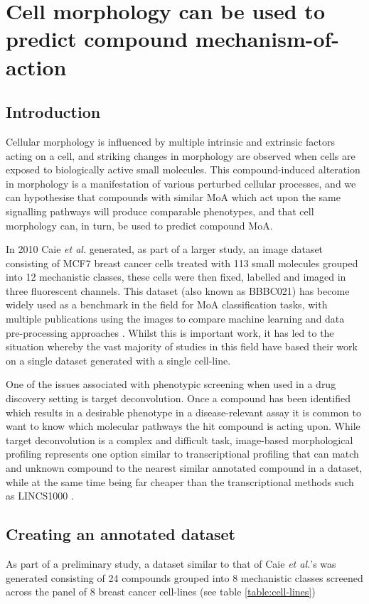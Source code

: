 \documentclass[a4paper,11pt,twoside,openright]{scrbook}
\begin{document}
\chapter{Cell morphology can be used to predict compound mechanism-of-action} \label{chapter:moa}

\section{Introduction}
Cellular morphology is influenced by multiple intrinsic and extrinsic factors acting on a cell, and striking changes in morphology are observed when cells are exposed to biologically active small molecules.
This compound-induced alteration in morphology is a manifestation of various perturbed cellular processes, and we can hypothesise that compounds with similar MoA which act upon the same signalling pathways will produce comparable phenotypes, and that cell morphology can, in turn, be used to predict compound MoA.

In 2010 Caie \textit{et al.} generated, as part of a larger study, an image dataset consisting of MCF7 breast cancer cells treated with 113 small molecules grouped into 12 mechanistic classes, these cells were then fixed, labelled and imaged in three fluorescent channels\cite{Caie2010}.
This dataset (also known as BBBC021) has become widely used as a benchmark in the field for MoA classification tasks, with multiple publications using the images to compare machine learning and data pre-processing approaches \cite{Ljosa2013a,Singh2014a,Pawlowski2016,Ando2017}.
Whilst this is important work, it has led to the situation whereby the vast majority of studies in this field have based their work on a single dataset generated with a single cell-line.

One of the issues associated with phenotypic screening when used in a drug discovery setting is target deconvolution.
Once a compound has been identified which results in a desirable phenotype in a disease-relevant assay it is common to want to know which molecular pathways the hit compound is acting upon.
While target deconvolution is a complex and difficult task, image-based morphological profiling represents one option similar to transcriptional profiling that can match and unknown compound to the nearest similar annotated compound in a dataset, while at the same time being far cheaper than the transcriptional methods such as LINCS1000 \cite{?lincs100 paper?}.


\section{Creating an annotated dataset}
%
As part of a preliminary study, a dataset similar to that of Caie \textit{et al.}'s was generated consisting of 24 compounds grouped into 8 mechanistic classes screened across the panel of 8 breast cancer cell-lines (see table \ref{table:cell-lines})
\end{document}
